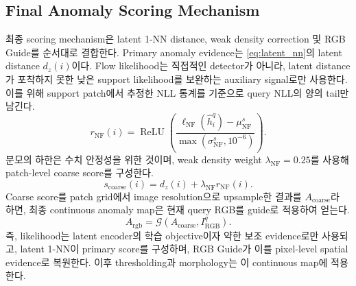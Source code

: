 \subsection{Final Anomaly Scoring Mechanism}
\label{sec:final_scoring}

최종 scoring mechanism은 latent 1-NN distance, weak density correction 및 RGB
Guide를 순서대로 결합한다. Primary anomaly evidence는
\cref{eq:latent_nn}의 latent distance $d_z(i)$이다. Flow likelihood는 직접적인
detector가 아니라, latent distance가 포착하지 못한 낮은 support likelihood를
보완하는 auxiliary signal로만 사용한다. 이를 위해 support patch에서 추정한 NLL
통계를 기준으로 query NLL의 양의 tail만 남긴다.
\begin{equation}
  r_{\mathrm{NF}}(i)=\operatorname{ReLU}\!\left(
    \frac{\ell_{\mathrm{NF}}(\widehat h_i^q)-\mu_{\mathrm{NF}}^s}
         {\max(\sigma_{\mathrm{NF}}^s,10^{-6})}
  \right).
  \label{eq:weak_nll}
\end{equation}
분모의 하한은 수치 안정성을 위한 것이며, weak density weight $\lambda_{\mathrm{NF}}=0.25$를
사용해 patch-level coarse score를 구성한다.
\begin{equation}
  s_{\mathrm{coarse}}(i)
    =d_z(i)+\lambda_{\mathrm{NF}}r_{\mathrm{NF}}(i).
  \label{eq:coarse_score}
\end{equation}
Coarse score를 patch grid에서 image resolution으로 upsample한 결과를
$A_{\mathrm{coarse}}$라 하면, 최종 continuous anomaly map은 현재 query RGB를
guide로 적용하여 얻는다.
\begin{equation}
  A_{\mathrm{rgb}}
    =\mathcal{G}(A_{\mathrm{coarse}},I_{\mathrm{RGB}}^q).
  \label{eq:rgb_guide}
\end{equation}
즉, likelihood는 latent encoder의 학습 objective이자 약한 보조 evidence로만
사용되고, latent 1-NN이 primary score를 구성하며, RGB Guide가 이를 pixel-level
spatial evidence로 복원한다. 이후 thresholding과 morphology는 이 continuous map에
적용한다.
